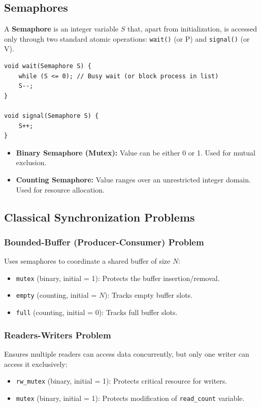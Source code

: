 \documentclass[12pt,a4paper]{article}
\begin{document}
\subsection{Semaphores}
A \textbf{Semaphore} is an integer variable $S$ that, apart from initialization, is accessed only through two standard atomic operations: \texttt{wait()} (or P) and \texttt{signal()} (or V).

\begin{tcolorbox}[formulabox, title={\textbf{Semaphore Atomic Implementations}}]
\begin{verbatim}
void wait(Semaphore S) {
    while (S <= 0); // Busy wait (or block process in list)
    S--;
}

void signal(Semaphore S) {
    S++;
}
\end{verbatim}
\begin{itemize}[leftmargin=*, itemsep=3pt]
  \item \textbf{Binary Semaphore (Mutex):} Value can be either 0 or 1. Used for mutual exclusion.
  \item \textbf{Counting Semaphore:} Value ranges over an unrestricted integer domain. Used for resource allocation.
\end{itemize}
\end{tcolorbox}

\subsection{Classical Synchronization Problems}

\subsubsection{Bounded-Buffer (Producer-Consumer) Problem}
Uses semaphores to coordinate a shared buffer of size $N$:
\begin{itemize}[leftmargin=*, itemsep=3pt]
  \item \texttt{mutex} (binary, initial = 1): Protects the buffer insertion/removal.
  \item \texttt{empty} (counting, initial = $N$): Tracks empty buffer slots.
  \item \texttt{full} (counting, initial = 0): Tracks full buffer slots.
\end{itemize}

\subsubsection{Readers-Writers Problem}
Ensures multiple readers can access data concurrently, but only one writer can access it exclusively:
\begin{itemize}[leftmargin=*, itemsep=3pt]
  \item \texttt{rw\_mutex} (binary, initial = 1): Protects critical resource for writers.
  \item \texttt{mutex} (binary, initial = 1): Protects modification of \texttt{read\_count} variable.
\end{itemize}
\end{document}
